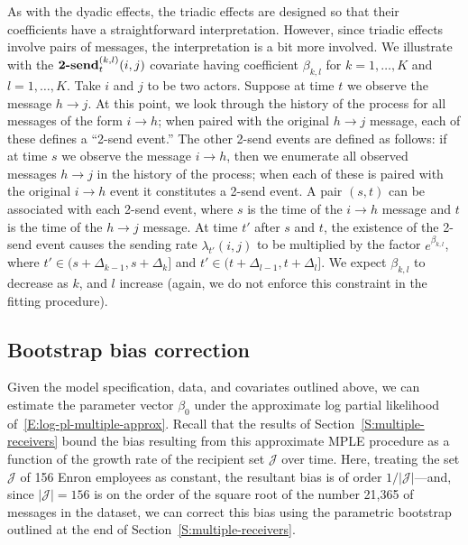 \documentclass[final]{statsoc}
\begin{document}
As with the dyadic effects, the triadic effects are designed so that their
coefficients have a straightforward interpretation.  However, since triadic
effects involve pairs of messages, the interpretation is a bit more involved.
We illustrate with the $\text{\textbf{2-send}}^{(k,l)}_t(i,j)$ covariate
having coefficient $\beta_{k,l}$ for $k = 1, \dotsc, K$ and $l = 1, \dotsc,
K$.  Take $i$ and $j$ to be two actors.  Suppose at time $t$ we observe the
message $h \to j$.  At this point, we look through the history of the process
for all messages of the form $i \to h$; when paired with the original $h \to
j$ message, each of these defines a ``2-send event.''  The other 2-send events
are defined as follows: if at time $s$ we observe the message $i \to h$, then
we enumerate all observed messages $h \to j$ in the history of the process;
when each of these is paired with the original $i \to h$ event it constitutes
a 2-send event.  A pair $(s,t)$ can be associated with each 2-send event,
where $s$ is the time of the $i \to h$ message and $t$ is the time of the $h
\to j$ message.  At time $t'$ after $s$ and $t$, the existence of the 2-send
event causes the sending rate $\lambda_{t'}(i,j)$ to be multiplied by the
factor $e^{\beta_{k,l}}$, where $t' \in (s + \Delta_{k-1}, s + \Delta_{k}]$
and $t' \in (t + \Delta_{l-1}, t + \Delta_l]$.  We expect $\beta_{k,l}$ to
decrease as $k$, and $l$ increase (again, we do not enforce this constraint in
the fitting procedure).


\subsection{Bootstrap bias correction}\label{S:enron-bootstrap}

Given the model specification, data, and covariates outlined above, we can
estimate the parameter vector $\beta_0$ under the approximate
log partial likelihood of~\eqref{E:log-pl-multiple-approx}.  Recall
that the results of Section~\ref{S:multiple-receivers} bound the bias
resulting from this approximate MPLE procedure as a function of the growth
rate of the recipient set $\mathcal{J}$ over time.  Here, treating the
set $\mathcal{J}$ of 156 Enron employees as constant, the resultant bias
is of order $1/|\mathcal{J}|$---and, since $|\mathcal{J}| = 156$ is on the
order of the square root of the number 21,365 of messages in the dataset,
we can correct this bias using the parametric bootstrap outlined at the
end of Section~\ref{S:multiple-receivers}.  
\end{document}

